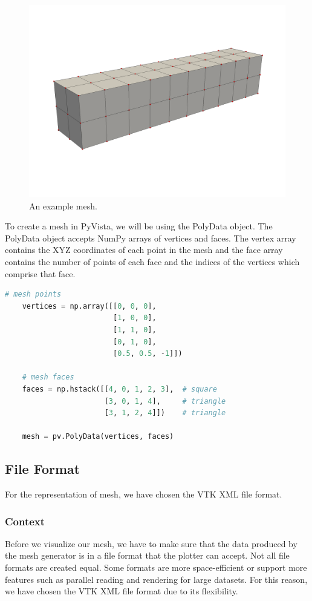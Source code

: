 \documentclass[onecolumn, draftclsnofoot,10pt, compsoc]{IEEEtran}
\begin{document}
\begin{figure}[H]
\centering
\includegraphics[scale=0.2]{mesh.png}
\caption{An example mesh.}
\label{fig:mesh}
\end{figure}

\noindent
To create a mesh in PyVista, we will be using the PolyData object. The PolyData object accepts NumPy arrays of vertices and faces. The vertex array contains the XYZ coordinates of each point in the mesh and the face array contains the number of points of each face and the indices of the vertices which comprise that face.

\begin{lstlisting}[language=python]
    # mesh points
    vertices = np.array([[0, 0, 0],
                         [1, 0, 0],
                         [1, 1, 0],
                         [0, 1, 0],
                         [0.5, 0.5, -1]])

    # mesh faces
    faces = np.hstack([[4, 0, 1, 2, 3],  # square
                       [3, 0, 1, 4],     # triangle
                       [3, 1, 2, 4]])    # triangle

    mesh = pv.PolyData(vertices, faces)
\end{lstlisting}

\subsection{File Format}
For the representation of mesh, we have chosen the VTK XML file format.
\subsubsection{Context}
Before we visualize our mesh, we have to make sure that the data produced by the mesh generator is in a file format that the plotter can accept. Not all file formats are created equal. Some formats are more space-efficient or support more features such as parallel reading and rendering for large datasets. For this reason, we have chosen the VTK XML file format due to its flexibility.
\end{document}
